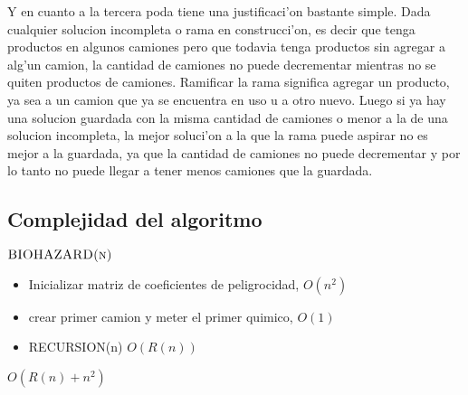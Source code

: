 Y en cuanto a la tercera poda tiene una justificaci'on bastante simple. Dada cualquier solucion incompleta o rama en construcci'on, es decir que tenga productos en algunos camiones pero que todavia tenga productos sin agregar a alg'un camion, la cantidad de camiones no puede decrementar mientras no se quiten productos de camiones. Ramificar la rama significa agregar un producto, ya sea a un camion que ya se encuentra en uso u a otro nuevo. Luego si ya hay una solucion guardada con la misma cantidad de camiones o menor a la de una solucion incompleta, la mejor soluci'on a la que la rama puede aspirar no es mejor a la guardada, ya que la cantidad de camiones no puede decrementar y por lo tanto no puede llegar a tener menos camiones que la guardada.


\subsection{Complejidad del algoritmo}




$\textnormal{\scshape BIOHAZARD(n)}$
\begin{itemize}
	\item Inicializar matriz de coeficientes de peligrocidad,		$O(n^2)$
	\item crear primer camion y meter el primer quimico,		$O(1)$
	\item RECURSION(n)										$O(R(n))$
\end{itemize}		$O(R(n) + n^2 )$ 




